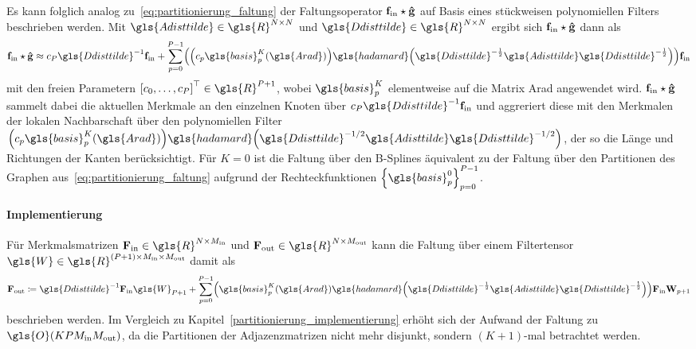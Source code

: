 Es kann folglich analog zu~\eqref{eq:partitionierung_faltung} der Faltungsoperator $\mathbf{f}_{\mathrm{in}} \star \mathbf{\hat g}$ auf Basis eines stückweisen polynomiellen Filters beschrieben werden.
Mit $\gls{Adisttilde} \in \gls{R}^{N \times N}$ und $\gls{Ddisttilde} \in \gls{R}^{N \times N}$ ergibt sich $\mathbf{f}_{\mathrm{in}} \star \mathbf{\hat g}$ dann als
\begin{equation*}
  \ve{f}_{\mathrm{in}} \star \ve{\hat g} \approx c_P \gls{Ddisttilde}^{-1}\ve{f}_{\mathrm{in}} + \sum_{p=0}^{P-1} \left(\left(c_p \gls{basis}_p^K\left(\gls{Arad}\right)\right)\gls{hadamard}\left(\gls{Ddisttilde}^{-\frac{1}{2}}\gls{Adisttilde}\gls{Ddisttilde}^{-\frac{1}{2}}\right)\right)\ve{f}_{\mathrm{in}}
\end{equation*}
mit den freien Parametern ${\left[c_0, \ldots, c_P\right]}^{\top} \in \gls{R}^{P+1}$, wobei $\gls{basis}_p^K$ elementweise auf die Matrix \gls{Arad} angewendet wird.
$\mathbf{f}_{\mathrm{in}} \star \mathbf{\hat g}$ sammelt dabei die aktuellen Merkmale an den einzelnen Knoten über $c_P \gls{Ddisttilde}^{-1}\ve{f}_{\mathrm{in}}$ und aggreriert diese mit den Merkmalen der lokalen Nachbarschaft über den polynomiellen Filter $\left(c_p\gls{basis}_p^K \left(\gls{Arad}\right)\right) \gls{hadamard} \left(\gls{Ddisttilde}^{-1/2}\gls{Adisttilde}\gls{Ddisttilde}^{-1/2}\right)$, der so die Länge und Richtungen der Kanten berücksichtigt.
Für $K=0$ ist die Faltung über den B-Splines äquivalent zu der Faltung über den Partitionen des Graphen aus~\eqref{eq:partitionierung_faltung} aufgrund der Rechteckfunktionen ${\left\{\gls{basis}_p^0\right\}}_{p=0}^{P-1}$.

\paragraph{Implementierung}
\label{bspline_implementierung}

Für Merkmalsmatrizen $\ma{F}_{\mathrm{in}} \in \gls{R}^{N \times M_{\mathrm{in}}}$ und $\ma{F}_{\mathrm{out}} \in \gls{R}^{N \times M_{\mathrm{out}}}$ kann die Faltung über einem Filtertensor $\gls{W} \in \gls{R}^{\left(P+1\right) \times M_{\mathrm{in}} \times M_{\mathrm{out}}}$ damit als
\begin{equation*}
  \ma{F}_{\mathrm{out}} \coloneqq \gls{Ddisttilde}^{-1}\ma{F}_{\mathrm{in}}\gls{W}_{P+1} + \sum_{p=0}^{P-1} \left(\gls{basis}_p^K\left(\gls{Arad}\right) \gls{hadamard}\left(\gls{Ddisttilde}^{-\frac{1}{2}}\gls{Adisttilde}\gls{Ddisttilde}^{-\frac{1}{2}}\right)\right)\ma{F}_{\mathrm{in}}\ma{W}_{p+1}
\end{equation*}
beschrieben werden.
Im Vergleich zu Kapitel~\eqref{partitionierung_implementierung} erhöht sich der Aufwand der Faltung zu $\gls{O}\left(KPM_{\mathrm{in}}M_{\mathrm{out}}\right)$, da die Partitionen der Adjazenzmatrizen nicht mehr disjunkt, sondern $\left(K+1\right)$-mal betrachtet werden.

